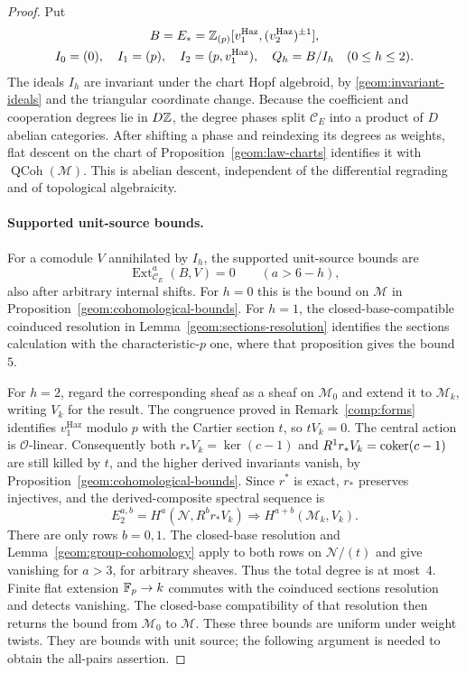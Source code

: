 \begin{proof}
Put
\[
 \begin{gathered}
 B=E_*=\mathbb Z_{(p)}[v_1^{\mathrm{Haz}},(v_2^{\mathrm{Haz}})^{\pm1}],
 \\
 I_0=(0),\quad I_1=(p),\quad
 I_2=(p,v_1^{\mathrm{Haz}}),\quad Q_h=B/I_h\quad(0\leq h\leq2).
 \end{gathered}
\]
The ideals $I_h$ are invariant under the chart Hopf algebroid, by
\eqref{geom:invariant-ideals} and the triangular coordinate change.
Because the coefficient and cooperation degrees lie in $D\mathbb Z$, the
degree phases split $\mathscr C_E$ into a product of $D$ abelian
categories. After shifting a phase and reindexing its degrees as
weights, flat descent on the chart of Proposition~\ref{geom:law-charts}
identifies it with $\operatorname{QCoh}(\mathcal M)$. This is abelian
descent, independent of the differential regrading and of topological
algebraicity.

\paragraph{Supported unit-source bounds.}
For a comodule $V$ annihilated by $I_h$, the supported
unit-source bounds are
\[
 \operatorname{Ext}_{\mathscr C_E}^{a}(B,V)=0\qquad(a>6-h),
\]
also after arbitrary internal shifts. For $h=0$ this is the bound on
$\mathcal M$ in Proposition~\ref{geom:cohomological-bounds}. For $h=1$,
the closed-base-compatible coinduced resolution in
Lemma~\ref{geom:sections-resolution} identifies the sections
calculation with the characteristic-$p$ one, where that proposition
gives the bound $5$.

For $h=2$, regard the corresponding sheaf as a sheaf on
$\mathcal M_0$ and extend it to $\mathcal M_k$, writing $V_k$ for the
result. The congruence proved in Remark~\ref{comp:forms} identifies
$v_1^{\mathrm{Haz}}$ modulo $p$ with the Cartier section $t$, so
$tV_k=0$. The central action is $\mathcal O$-linear. Consequently
both $r_*V_k=\ker(c-1)$ and $R^1r_*V_k=\operatorname{coker}(c-1)$ are still killed
by $t$, and the higher derived invariants vanish, by
Proposition~\ref{geom:cohomological-bounds}. Since $r^*$ is exact,
$r_*$ preserves injectives, and the derived-composite spectral
sequence is
\[
 E_2^{a,b}=H^a(\mathcal N,R^b r_*V_k)
 \Longrightarrow H^{a+b}(\mathcal M_k,V_k).
\]
There are only rows $b=0,1$. The closed-base resolution and
Lemma~\ref{geom:group-cohomology} apply to both rows on
$\mathcal N/(t)$ and give vanishing for $a>3$, for arbitrary sheaves.
Thus the total degree is at most~$4$. Finite flat extension
$\mathbb F_p\to k$ commutes with the coinduced sections resolution and
detects vanishing. The closed-base compatibility of that resolution
then returns the bound from $\mathcal M_0$ to $\mathcal M$. These three
bounds are uniform under weight
twists. They are bounds with unit source; the following argument is
needed to obtain the all-pairs assertion.


\end{proof}
